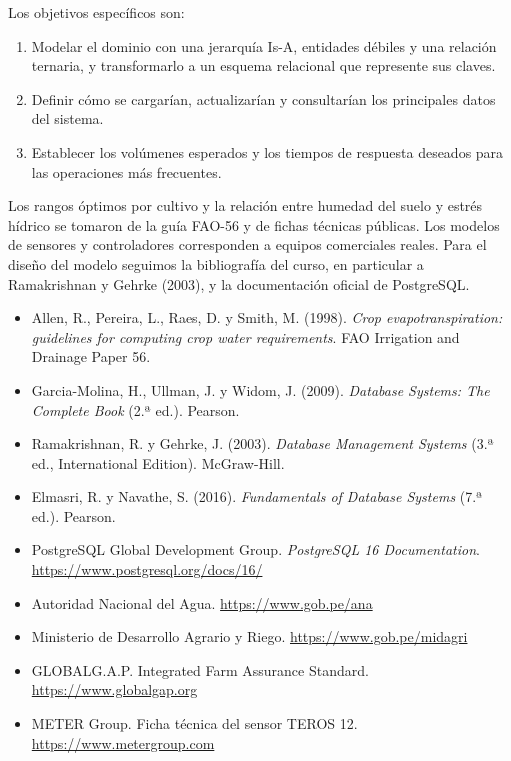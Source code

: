 \documentclass[11pt,letterpaper]{article}
\makeatletter
\renewcommand\subsection{\@startsection{subsection}{2}{\z@}{-3.25ex\@plus -1ex \@minus -.2ex}{1.5ex \@plus .2ex}{\normalfont\large\bfseries}}
\makeatother
\begin{document}
Los objetivos específicos son:
\begin{enumerate}[leftmargin=1.6em,itemsep=0.1em]
\item Modelar el dominio con una jerarquía Is-A, entidades débiles y una relación ternaria, y transformarlo a un esquema relacional que represente sus claves.
\item Definir cómo se cargarían, actualizarían y consultarían los principales datos del sistema.
\item Establecer los volúmenes esperados y los tiempos de respuesta deseados para las operaciones más frecuentes.
\end{enumerate}

\subsection{Referencias del proyecto}

Los rangos óptimos por cultivo y la relación entre humedad del suelo y estrés hídrico se tomaron de la guía FAO-56 y de fichas técnicas públicas. Los modelos de sensores y controladores corresponden a equipos comerciales reales. Para el diseño del modelo seguimos la bibliografía del curso, en particular a Ramakrishnan y Gehrke (2003), y la documentación oficial de PostgreSQL.

\begin{itemize}[leftmargin=1.4em,itemsep=0.1em]
\item Allen, R., Pereira, L., Raes, D. y Smith, M. (1998). \textit{Crop evapotranspiration: guidelines for computing crop water requirements}. FAO Irrigation and Drainage Paper 56.
\item Garcia-Molina, H., Ullman, J. y Widom, J. (2009). \textit{Database Systems: The Complete Book} (2.ª ed.). Pearson.
\item Ramakrishnan, R. y Gehrke, J. (2003). \textit{Database Management Systems} (3.ª ed., International Edition). McGraw-Hill.
\item Elmasri, R. y Navathe, S. (2016). \textit{Fundamentals of Database Systems} (7.ª ed.). Pearson.
\item PostgreSQL Global Development Group. \textit{PostgreSQL 16 Documentation}. \url{https://www.postgresql.org/docs/16/}
\item Autoridad Nacional del Agua. \url{https://www.gob.pe/ana}
\item Ministerio de Desarrollo Agrario y Riego. \url{https://www.gob.pe/midagri}
\item GLOBALG.A.P. Integrated Farm Assurance Standard. \url{https://www.globalgap.org}
\item METER Group. Ficha técnica del sensor TEROS 12. \url{https://www.metergroup.com}
\end{itemize}
\end{document}
